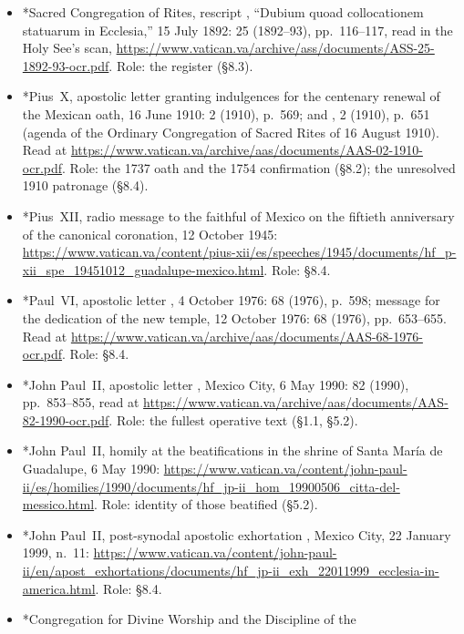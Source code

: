 \begin{itemize}
\item *Sacred Congregation of Rites, rescript ,
``Dubium quoad collocationem statuarum in Ecclesia,'' 15 July 1892:
 25 (1892--93), pp.~116--117, read in the
Holy See's scan,
\url{https://www.vatican.va/archive/ass/documents/ASS-25-1892-93-ocr.pdf}.
Role: the  register (\S8.3).
\item *Pius~X, apostolic letter granting indulgences for the centenary
renewal of the Mexican oath, 16 June 1910:  2 (1910),
p.~569; and ,  2 (1910),
p.~651 (agenda of the Ordinary Congregation of Sacred Rites of 16
August 1910). Read at
\url{https://www.vatican.va/archive/aas/documents/AAS-02-1910-ocr.pdf}.
Role: the 1737 oath and the 1754 confirmation (\S8.2); the unresolved
1910 patronage (\S8.4).
\item *Pius~XII, radio message to the faithful of Mexico on the
fiftieth anniversary of the canonical coronation, 12 October 1945:
\url{https://www.vatican.va/content/pius-xii/es/speeches/1945/documents/hf_p-xii_spe_19451012_guadalupe-mexico.html}.
Role: \S8.4.
\item *Paul~VI, apostolic letter , 4 October 1976:
 68 (1976), p.~598; message for the dedication of the new
temple, 12 October 1976:  68 (1976), pp.~653--655. Read at
\url{https://www.vatican.va/archive/aas/documents/AAS-68-1976-ocr.pdf}.
Role: \S8.4.
\item *John Paul~II, apostolic letter , Mexico City, 6 May 1990:
 82 (1990), pp.~853--855, read at
\url{https://www.vatican.va/archive/aas/documents/AAS-82-1990-ocr.pdf}.
Role: the fullest operative text (\S1.1, \S5.2).
\item *John Paul~II, homily at the beatifications in the shrine of
Santa Mar\'ia de Guadalupe, 6 May 1990:
\url{https://www.vatican.va/content/john-paul-ii/es/homilies/1990/documents/hf_jp-ii_hom_19900506_citta-del-messico.html}.
Role: identity of those beatified (\S5.2).
\item *John Paul~II, post-synodal apostolic exhortation , Mexico City, 22 January 1999, n.~11:
\url{https://www.vatican.va/content/john-paul-ii/en/apost_exhortations/documents/hf_jp-ii_exh_22011999_ecclesia-in-america.html}.
Role: \S8.4.
\item *Congregation for Divine Worship and the Discipline of the

\end{itemize}

